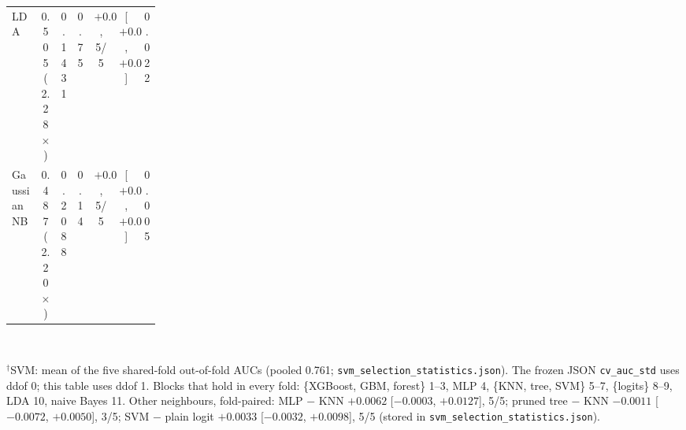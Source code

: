 \begin{table}[!htbp]
\begin{tabular}{@{}L{0.22\linewidth}cccccc@{}}
    LDA & 0.505 (2.28$\times$) & 0.1431 & 0.75 & $+0.0291$, 5/5 & [$+0.0169$, $+0.0413$] & 0.022 \\
    Gaussian NB & 0.487 (2.20$\times$) & 0.2088 & 0.14 & $+0.0507$, 5/5 & [$+0.0368$, $+0.0645$] & 0.005 \\
    \bottomrule
  \end{tabular}
  \\[3pt]\begin{minipage}{\linewidth}\footnotesize $^{\dagger}$SVM: mean of the five shared-fold out-of-fold AUCs (pooled 0.761; \texttt{svm\_selection\_statistics.json}). The frozen JSON \texttt{cv\_auc\_std} uses ddof 0; this table uses ddof 1. Blocks that hold in every fold: \{XGBoost, GBM, forest\} 1--3, MLP 4, \{KNN, tree, SVM\} 5--7, \{logits\} 8--9, LDA 10, naive Bayes 11. Other neighbours, fold-paired: MLP $-$ KNN $+0.0062$ [$-0.0003$, $+0.0127$], 5/5; pruned tree $-$ KNN $-0.0011$ [$-0.0072$, $+0.0050$], 3/5; SVM $-$ plain logit $+0.0033$ [$-0.0032$, $+0.0098$], 5/5 (stored in \texttt{svm\_selection\_statistics.json}).\end{minipage}
\end{table}

